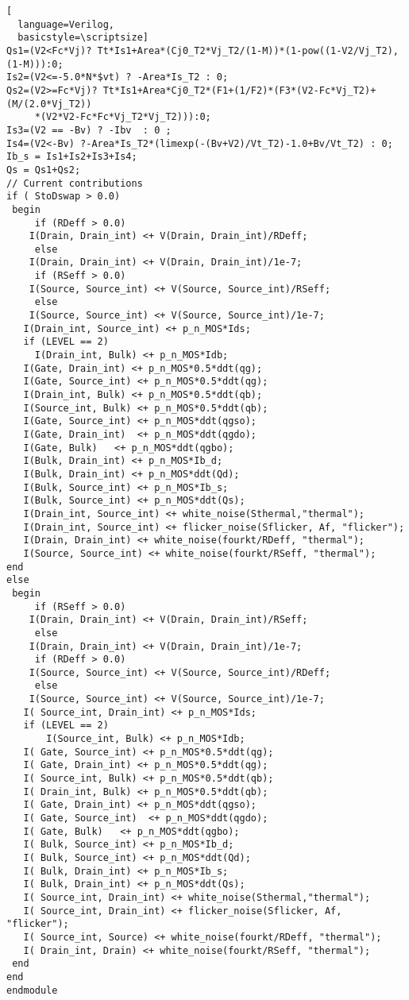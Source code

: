 \begin{lstlisting}[
  language=Verilog,
  basicstyle=\scriptsize]
Qs1=(V2<Fc*Vj)? Tt*Is1+Area*(Cj0_T2*Vj_T2/(1-M))*(1-pow((1-V2/Vj_T2),(1-M))):0;
Is2=(V2<=-5.0*N*$vt) ? -Area*Is_T2 : 0;
Qs2=(V2>=Fc*Vj)? Tt*Is1+Area*Cj0_T2*(F1+(1/F2)*(F3*(V2-Fc*Vj_T2)+(M/(2.0*Vj_T2))
     *(V2*V2-Fc*Fc*Vj_T2*Vj_T2))):0;
Is3=(V2 == -Bv) ? -Ibv  : 0 ;
Is4=(V2<-Bv) ?-Area*Is_T2*(limexp(-(Bv+V2)/Vt_T2)-1.0+Bv/Vt_T2) : 0;
Ib_s = Is1+Is2+Is3+Is4;
Qs = Qs1+Qs2;
// Current contributions
if ( StoDswap > 0.0)
 begin
     if (RDeff > 0.0)
	I(Drain, Drain_int) <+ V(Drain, Drain_int)/RDeff;
     else
	I(Drain, Drain_int) <+ V(Drain, Drain_int)/1e-7;
     if (RSeff > 0.0)
	I(Source, Source_int) <+ V(Source, Source_int)/RSeff;
     else
	I(Source, Source_int) <+ V(Source, Source_int)/1e-7;
   I(Drain_int, Source_int) <+ p_n_MOS*Ids;
   if (LEVEL == 2)
     I(Drain_int, Bulk) <+ p_n_MOS*Idb;
   I(Gate, Drain_int) <+ p_n_MOS*0.5*ddt(qg);
   I(Gate, Source_int) <+ p_n_MOS*0.5*ddt(qg);
   I(Drain_int, Bulk) <+ p_n_MOS*0.5*ddt(qb);
   I(Source_int, Bulk) <+ p_n_MOS*0.5*ddt(qb);
   I(Gate, Source_int) <+ p_n_MOS*ddt(qgso);
   I(Gate, Drain_int)  <+ p_n_MOS*ddt(qgdo);
   I(Gate, Bulk)   <+ p_n_MOS*ddt(qgbo);
   I(Bulk, Drain_int) <+ p_n_MOS*Ib_d;
   I(Bulk, Drain_int) <+ p_n_MOS*ddt(Qd);
   I(Bulk, Source_int) <+ p_n_MOS*Ib_s;
   I(Bulk, Source_int) <+ p_n_MOS*ddt(Qs);
   I(Drain_int, Source_int) <+ white_noise(Sthermal,"thermal");
   I(Drain_int, Source_int) <+ flicker_noise(Sflicker, Af, "flicker");
   I(Drain, Drain_int) <+ white_noise(fourkt/RDeff, "thermal");
   I(Source, Source_int) <+ white_noise(fourkt/RSeff, "thermal");
end
else
 begin
     if (RSeff > 0.0)
	I(Drain, Drain_int) <+ V(Drain, Drain_int)/RSeff;
     else
	I(Drain, Drain_int) <+ V(Drain, Drain_int)/1e-7;
     if (RDeff > 0.0)
	I(Source, Source_int) <+ V(Source, Source_int)/RDeff;
     else
	I(Source, Source_int) <+ V(Source, Source_int)/1e-7;
   I( Source_int, Drain_int) <+ p_n_MOS*Ids;
   if (LEVEL == 2)
       I(Source_int, Bulk) <+ p_n_MOS*Idb;
   I( Gate, Source_int) <+ p_n_MOS*0.5*ddt(qg);
   I( Gate, Drain_int) <+ p_n_MOS*0.5*ddt(qg);
   I( Source_int, Bulk) <+ p_n_MOS*0.5*ddt(qb);
   I( Drain_int, Bulk) <+ p_n_MOS*0.5*ddt(qb);
   I( Gate, Drain_int) <+ p_n_MOS*ddt(qgso);
   I( Gate, Source_int)  <+ p_n_MOS*ddt(qgdo);
   I( Gate, Bulk)   <+ p_n_MOS*ddt(qgbo);
   I( Bulk, Source_int) <+ p_n_MOS*Ib_d;
   I( Bulk, Source_int) <+ p_n_MOS*ddt(Qd);
   I( Bulk, Drain_int) <+ p_n_MOS*Ib_s;
   I( Bulk, Drain_int) <+ p_n_MOS*ddt(Qs);
   I( Source_int, Drain_int) <+ white_noise(Sthermal,"thermal");
   I( Source_int, Drain_int) <+ flicker_noise(Sflicker, Af, "flicker");
   I( Source_int, Source) <+ white_noise(fourkt/RDeff, "thermal");
   I( Drain_int, Drain) <+ white_noise(fourkt/RSeff, "thermal");
 end
end
endmodule
\end{lstlisting}
